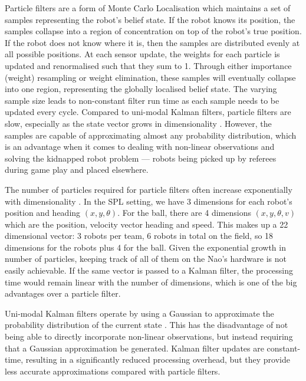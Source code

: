 \documentclass[pdftex,11pt,a4paper]{report}
\begin{document}
Particle filters are a form of Monte Carlo Localisation \cite{Fox_1999_534} which maintains a set of samples representing the robot's belief state. If the robot knows its position, the samples collapse into a region of concentration on top of the robot's true position. If the robot does not know where it is, then the samples are distributed evenly at all possible positions. At each sensor update, the weights for each particle is updated and renormalised such that they sum to 1. Through either importance (weight) resampling or weight elimination, these samples will eventually collapse into one region, representing the globally localised belief state. The varying sample size leads to non-constant filter run time as each sample needs to be updated every cycle. Compared to uni-modal Kalman filters, particle filters are slow, especially as the state vector grows in dimensionality \cite{rekleitispftut}. However, the samples are capable of approximating almost any probability distribution, which is an advantage when it comes to dealing with non-linear observations and solving the kidnapped robot problem \cite{Burchardt10} --- robots being picked up by referees during game play and placed elsewhere. 

The number of particles required for particle filters often increase exponentially with dimensionality \cite{rekleitispftut}. In the SPL setting, we have 3 dimensions for each robot's position and heading $(x, y, \theta)$. For the ball, there are 4 dimensions $(x, y, \theta, v)$ which are the position, velocity vector heading and speed. This makes up a 22 dimensional vector: 3 robots per team, 6 robots in total on the field, so 18 dimensions for the robots plus 4 for the ball. Given the exponential growth in number of particles, keeping track of all of them on the Nao's hardware is not easily achievable. If the same vector is passed to a Kalman filter, the processing time would remain linear with the number of dimensions, which is one of the big advantages over a particle filter. 

Uni-modal Kalman filters operate by using a Gaussian to approximate the probability distribution of the current state \cite{Welch95anintroduction}. This has the disadvantage of not being able to directly incorporate non-linear observations, but instead requiring that a Gaussian approximation be generated. Kalman filter updates are constant-time, resulting in a significantly reduced processing overhead, but they provide less accurate approximations compared with particle filters. 
\end{document}
